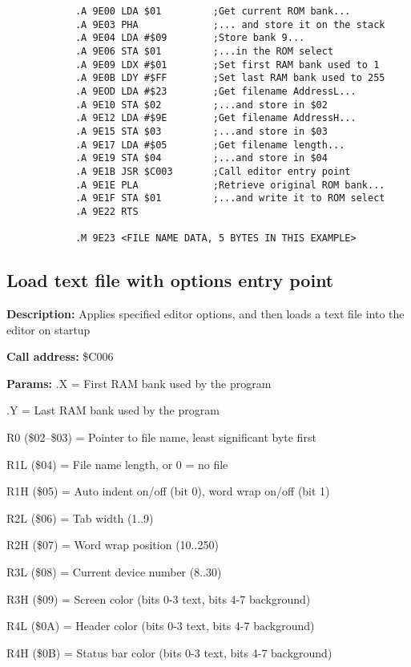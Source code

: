 \documentclass{article}
\begin{document}
        \begin{verbatim}
            .A 9E00 LDA $01         ;Get current ROM bank...
            .A 9E03 PHA             ;... and store it on the stack
            .A 9E04 LDA #$09        ;Store bank 9...
            .A 9E06 STA $01         ;...in the ROM select
            .A 9E09 LDX #$01        ;Set first RAM bank used to 1
            .A 9E0B LDY #$FF        ;Set last RAM bank used to 255
            .A 9EOD LDA #$23        ;Get filename AddressL...
            .A 9E10 STA $02         ;...and store in $02
            .A 9E12 LDA #$9E        ;Get filename AddressH...
            .A 9E15 STA $03         ;...and store in $03
            .A 9E17 LDA #$05        ;Get filename length...
            .A 9E19 STA $04         ;...and store in $04
            .A 9E1B JSR $C003       ;Call editor entry point
            .A 9E1E PLA             ;Retrieve original ROM bank...
            .A 9E1F STA $01         ;...and write it to ROM select
            .A 9E22 RTS

            .M 9E23 <FILE NAME DATA, 5 BYTES IN THIS EXAMPLE>
        \end{verbatim}    

\subsection{Load text file with options entry point}

        \begin{hangparas}{3cm}{1}

            \textbf{Description:} \tabto{3cm} Applies specified editor options, and then loads a text file into the editor on startup

            \textbf{Call address:} \tabto{3cm}\$C006

            \textbf{Params:} \tabto{3cm}.X = First RAM bank used by the program
        
            \tabto{3cm} .Y = Last RAM bank used by the program

            \tabto{3cm} R0 (\$02--\$03) = Pointer to file name, least significant byte first

            \tabto{3cm} R1L (\$04) = File name length, or 0 = no file

            \tabto{3cm} R1H (\$05) = Auto indent on/off (bit 0), word wrap on/off (bit 1)

            \tabto{3cm} R2L (\$06) = Tab width (1..9)

            \tabto{3cm} R2H (\$07) = Word wrap position (10..250)

            \tabto{3cm} R3L (\$08) = Current device number (8..30)

            \tabto{3cm} R3H (\$09) = Screen color (bits 0-3 text, bits 4-7 background)

            \tabto{3cm} R4L (\$0A) = Header color (bits 0-3 text, bits 4-7 background)

            \tabto{3cm} R4H (\$0B) = Status bar color (bits 0-3 text, bits 4-7 background)

        \end{hangparas}
\end{document}
